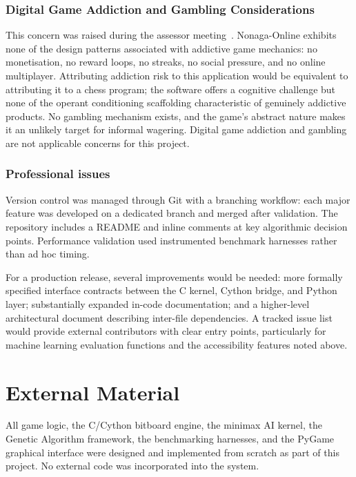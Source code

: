 \begin{appendices}
\subsection{Digital Game Addiction and Gambling Considerations}

This concern was raised during the assessor meeting~\cite{assessor}. Nonaga-Online exhibits none of the design patterns associated with addictive game mechanics: no monetisation, no reward loops, no streaks, no social pressure, and no online multiplayer. Attributing addiction risk to this application would be equivalent to attributing it to a chess program; the software offers a cognitive challenge but none of the operant conditioning scaffolding characteristic of genuinely addictive products. No gambling mechanism exists, and the game's abstract nature makes it an unlikely target for informal wagering. Digital game addiction and gambling are not applicable concerns for this project.

\subsection{Professional issues}

Version control was managed through Git with a branching workflow: each major feature was developed on a dedicated branch and merged after validation. The repository includes a README and inline comments at key algorithmic decision points. Performance validation used instrumented benchmark harnesses rather than ad hoc timing.

For a production release, several improvements would be needed: more formally specified interface contracts between the C kernel, Cython bridge, and Python layer; substantially expanded in-code documentation; and a higher-level architectural document describing inter-file dependencies. A tracked issue list would provide external contributors with clear entry points, particularly for machine learning evaluation functions and the accessibility features noted above.

%
%
\chapter{External Material}

All game logic, the C/Cython bitboard engine, the minimax AI kernel, the Genetic Algorithm framework, the benchmarking harnesses, and the PyGame graphical interface were designed and implemented from scratch as part of this project. No external code was incorporated into the system.


\end{appendices}

